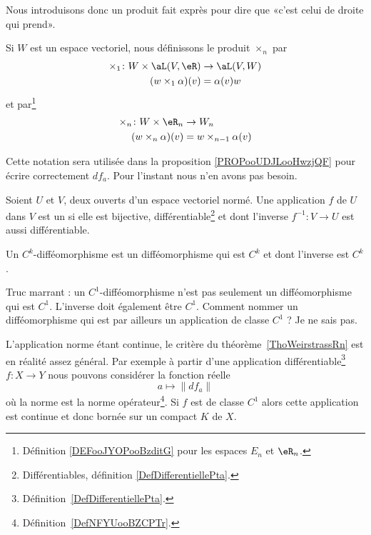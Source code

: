 Nous introduisons donc un produit fait exprès pour dire que «c'est celui de droite qui prend».
\begin{definition}       \label{DEFooLULCooYjBEaZ}
	Si \( W\) est un espace vectoriel, nous définissons le produit \( \times_n\) par
	\begin{equation}
		\begin{aligned}
			\times_1\colon W\times \aL(V,\eR) & \to \aL(V,W) \\
			(w\times_1\alpha)(v)              & =\alpha(v)w
		\end{aligned}
	\end{equation}
	et par\footnote{Définition \ref{DEFooJYOPooBzditG} pour les espaces \( E_n\) et \( \eR_n\).}
	\begin{equation}
		\begin{aligned}
			\times_n\colon W\times \eR_n & \to W_n                  \\
			(w\times_n\alpha)(v)         & =w\times_{n-1} \alpha(v)
		\end{aligned}
	\end{equation}
\end{definition}
Cette notation sera utilisée dans la proposition \ref{PROPooUDJLooHwzjQF} pour écrire correctement \( df_a\). Pour l'instant nous n'en avons pas besoin.

\begin{definition}[difféomorphisme]      \label{DefAQIQooYqZdya}
	Soient \( U\) et \( V\), deux ouverts d'un espace vectoriel normé. Une application \( f\) de \( U\) dans \( V\) est un  si elle est bijective, différentiable\footnote{Différentiables, définition \ref{DefDifferentiellePta}.} et dont l'inverse \( f^{-1}:V\to U \) est aussi différentiable.

	Un \( C^k\)-difféomorphisme est un difféomorphisme qui est \( C^k\) et dont l'inverse est \( C^k\).
\end{definition}

\begin{normaltext}
	Truc marrant : un \( C^1\)-difféomorphisme n'est pas seulement un difféomorphisme qui est \( C^1\). L'inverse doit également être \( C^1\). Comment nommer un difféomorphisme qui est par ailleurs un application de classe \( C^1\) ? Je ne sais pas.
\end{normaltext}

\begin{remark}      \label{RemATQVooDnZBbs}
	L'application norme étant continue, le critère du théorème~\ref{ThoWeirstrassRn} est en réalité assez général. Par exemple à partir d'une application différentiable\footnote{Définition~\ref{DefDifferentiellePta}.} \( f\colon X\to Y\)  nous pouvons considérer la fonction réelle
	\begin{equation}
		a\mapsto \|  df_a   \|
	\end{equation}
	où la norme est la norme opérateur\footnote{Définition~\ref{DefNFYUooBZCPTr}.}. Si \( f\) est de classe \( C^1\) alors cette application est continue et donc bornée sur un compact \( K\) de \( X\).
\end{remark}

